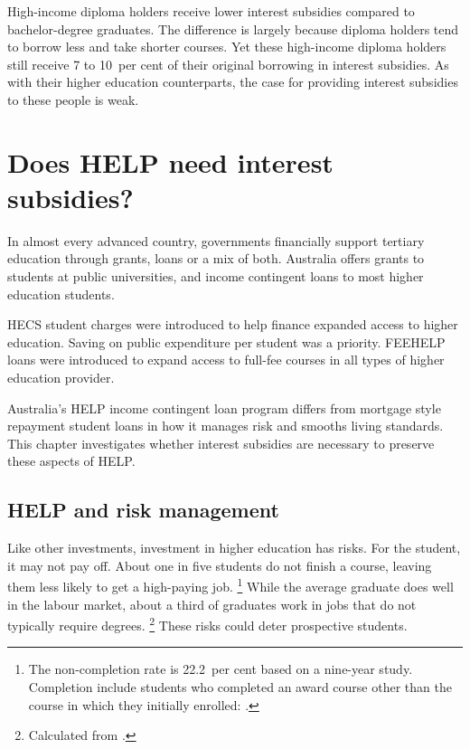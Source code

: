 \documentclass[embargoed]{grattan}
\begin{document}
High-income diploma holders receive lower interest subsidies compared to bachelor-degree graduates.
The difference is largely because diploma holders tend to borrow less and take shorter courses.
Yet these high-income diploma holders still receive 7 to 10~per cent of their original borrowing in interest subsidies.
As with their higher education counterparts, the case for providing interest subsidies to these people is weak.

\chapter[Does HELP need interest subsidies?]{Does \gls{HELP} need interest subsidies?}\label{chap:4-does-help-need-interest-subsidies}

In almost every advanced country, governments financially support tertiary education through grants, loans or a mix of both.
Australia offers grants to students at public universities, and income contingent loans to most higher education students.

\gls{HECS} student charges were introduced to help finance expanded access to higher education.
Saving on public expenditure per student was a priority.
\gls{FEEHELP} loans were introduced to expand access to full-fee courses in all types of higher education provider.

Australia's \gls{HELP} income contingent loan program differs from mortgage style repayment student loans in how it manages risk and smooths living standards.
This chapter investigates whether interest subsidies are necessary to preserve these aspects of \gls{HELP}\@.

\section[HELP and risk management]{\gls{HELP} and risk management}\label{help-and-risk-management}

Like other investments, investment in higher education has risks.
For the student, it may not pay off.
About one in five students do not finish a course, leaving them less likely to get a high-paying job.%
\footnote{The non-completion rate is 22.2~per cent based on a nine-year study.
Completion include students who completed an award course other than the course in which they initially enrolled: \textcite{Education2015Completionratesdomestic}.} 
While the average graduate does well in the labour market, about a third of graduates work in jobs that do not typically require degrees.%
\footnote{Calculated from \textcite[][Table~10]{ABS2015Educationwork2015}.} 
These risks could deter prospective students.
\end{document}
